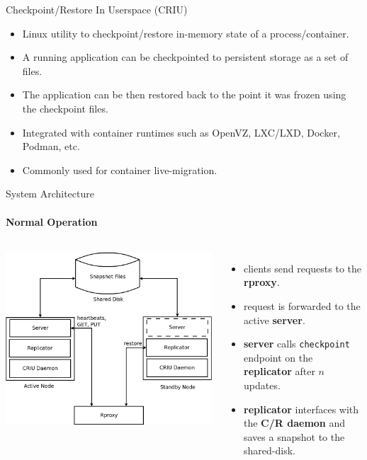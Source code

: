 \documentclass{beamer}
\begin{document}
\begin{frame}{Checkpoint/Restore In Userspace (CRIU)}
  \begin{itemize}
    \item Linux utility to checkpoint/restore in-memory state of a process/container. \pause
    \item A running application can be checkpointed to persistent storage as a set of files. \pause
    \item The application can be then restored back to the point it was frozen
    using the checkpoint files. \pause
    \item Integrated with container runtimes such as OpenVZ, LXC/LXD, Docker, Podman, etc.
    \item Commonly used for container live-migration.
  \end{itemize}
\end{frame}

\begin{frame}{System Architecture}
  \framesubtitle{Normal Operation}

  \begin{columns}
    \includegraphics[scale=0.15]{../paper/arch}

    \begin{itemize}
      \pause \item clients send requests to the \textbf{rproxy}.
      \pause \item request is forwarded to the active \textbf{server}.
      \pause \item \textbf{server} calls \texttt{checkpoint} endpoint on the \textbf{replicator} after $n$ updates.
      \pause \item \textbf{replicator} interfaces with the \textbf{C/R daemon} and saves a snapshot to the shared-disk.
    \end{itemize}
  \end{columns}
\end{frame}
\end{document}
